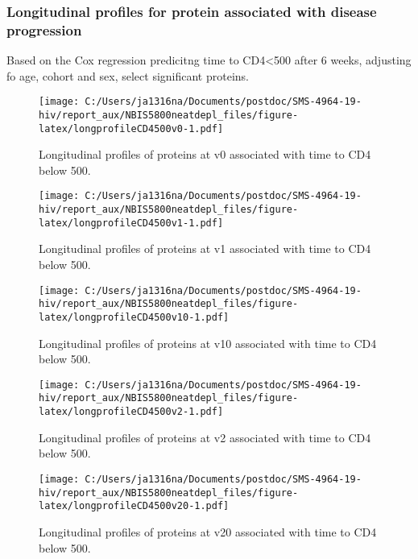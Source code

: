 \documentclass[
]{article}
\begin{document}
\FloatBarrier

\hypertarget{longitudinal-profiles-for-protein-associated-with-disease-progression}{%
\subsubsection{Longitudinal profiles for protein associated with disease progression}\label{longitudinal-profiles-for-protein-associated-with-disease-progression}}

Based on the Cox regression predicitng time to CD4\textless500 after 6 weeks, adjusting fo age, cohort and sex, select significant proteins.

\begin{figure}
\centering
\texttt{[image: C:/Users/ja1316na/Documents/postdoc/SMS-4964-19-hiv/report\_aux/NBIS5800neatdepl\_files/figure-latex/longprofileCD4500v0-1.pdf]}
\caption{\label{fig:longprofileCD4500v0}Longitudinal profiles of proteins at v0 associated with time to CD4 below 500.}
\end{figure}

\begin{figure}
\centering
\texttt{[image: C:/Users/ja1316na/Documents/postdoc/SMS-4964-19-hiv/report\_aux/NBIS5800neatdepl\_files/figure-latex/longprofileCD4500v1-1.pdf]}
\caption{\label{fig:longprofileCD4500v1}Longitudinal profiles of proteins at v1 associated with time to CD4 below 500.}
\end{figure}

\begin{figure}
\centering
\texttt{[image: C:/Users/ja1316na/Documents/postdoc/SMS-4964-19-hiv/report\_aux/NBIS5800neatdepl\_files/figure-latex/longprofileCD4500v10-1.pdf]}
\caption{\label{fig:longprofileCD4500v10}Longitudinal profiles of proteins at v10 associated with time to CD4 below 500.}
\end{figure}

\begin{figure}
\centering
\texttt{[image: C:/Users/ja1316na/Documents/postdoc/SMS-4964-19-hiv/report\_aux/NBIS5800neatdepl\_files/figure-latex/longprofileCD4500v2-1.pdf]}
\caption{\label{fig:longprofileCD4500v2}Longitudinal profiles of proteins at v2 associated with time to CD4 below 500.}
\end{figure}

\begin{figure}
\centering
\texttt{[image: C:/Users/ja1316na/Documents/postdoc/SMS-4964-19-hiv/report\_aux/NBIS5800neatdepl\_files/figure-latex/longprofileCD4500v20-1.pdf]}
\caption{\label{fig:longprofileCD4500v20}Longitudinal profiles of proteins at v20 associated with time to CD4 below 500.}
\end{figure}
\end{document}
